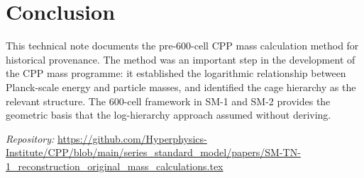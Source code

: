 \documentclass[11pt]{article}
\begin{document}
\section{Conclusion}

This technical note documents the pre-600-cell CPP mass calculation method
for historical provenance. The method was an important step in the
development of the CPP mass programme: it established the logarithmic
relationship between Planck-scale energy and particle masses, and identified
the cage hierarchy as the relevant structure. The 600-cell framework in SM-1
and SM-2 provides the geometric basis that the log-hierarchy approach assumed
without deriving.

\bigskip
\noindent\textit{Repository:}
\url{https://github.com/Hyperphysics-Institute/CPP/blob/main/series_standard_model/papers/SM-TN-1_reconstruction_original_mass_calculations.tex}
\end{document}

